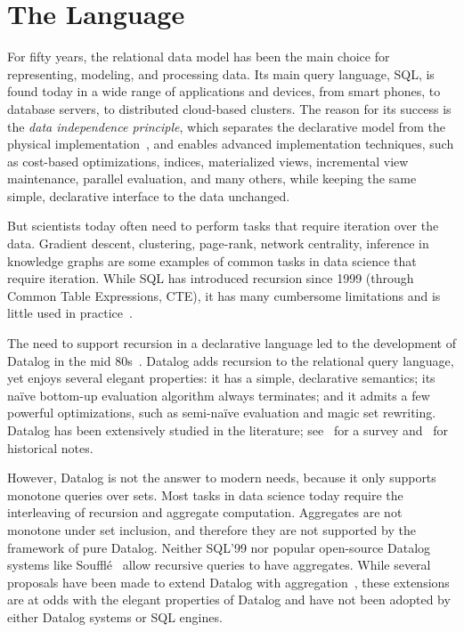 \chapter{The \datalogo Language}
\label{chap:datalogo}

For fifty years, the relational data model has been the main choice for
representing, modeling, and processing data.  Its main query
language, SQL, is found today in a wide range of applications and
devices, from smart phones, to database servers, to distributed
cloud-based clusters.  The reason for its success is the {\em data
  independence principle}, which separates the declarative model from
the physical implementation~\cite{DBLP:journals/cacm/Codd70}, and
enables advanced implementation techniques, such as cost-based
optimizations, indices, materialized views, incremental view
maintenance, parallel evaluation, and many others, while keeping the
same simple, declarative interface to the data unchanged.

But scientists today often need to perform tasks that require
iteration over the data.
Gradient descent, clustering, page-rank, network centrality, inference
in knowledge graphs are some examples of common tasks in data science
that require iteration.  While SQL has introduced recursion since 1999
(through Common Table Expressions, CTE), it has many cumbersome
limitations and is little used in practice~\cite{frankmcsherry-2022}.

The need to support recursion in a declarative language led to the
development of Datalog in the mid 80s~\cite{DBLP:conf/pods/Vianu21}.
Datalog adds recursion to the relational query language, yet enjoys several elegant
properties: it has a simple, declarative semantics; its na\"ive
bottom-up evaluation algorithm always terminates; and it admits a few
powerful optimizations, such as semi-na\"ive evaluation and magic set
rewriting.  Datalog has been extensively studied in the literature;
see~\cite{DBLP:journals/ftdb/GreenHLZ13} for a survey
and~\cite{DBLP:books/mc/18/MaierTKW18,DBLP:conf/pods/Vianu21} for historical notes.

However, Datalog is not the answer to modern needs, because it only
supports monotone queries over sets.  Most tasks in data science today
require the interleaving of recursion and aggregate computation.
Aggregates are not monotone under set inclusion, and therefore they
are not supported by the framework of pure Datalog.  Neither SQL'99
nor popular open-source Datalog systems like
Souffl\'e~\cite{DBLP:conf/cav/JordanSS16} allow recursive queries to
have aggregates.  While several proposals have been made to extend
Datalog with
aggregation~\cite{DBLP:conf/pods/GangulyGZ91,DBLP:conf/pods/RossS92,DBLP:journals/jcss/GangulyGZ95,DBLP:journals/vldb/MazuranSZ13,DBLP:conf/icde/ShkapskyYZ15,DBLP:conf/sigmod/ShkapskyYICCZ16,DBLP:conf/amw/ZanioloYDI16,DBLP:journals/tplp/ZanioloYDSCI17,DBLP:conf/amw/ZanioloYIDSC18,DBLP:journals/tplp/CondieDISYZ18,DBLP:conf/sigmod/0001WMSYDZ19,DBLP:journals/corr/abs-1910-08888,DBLP:journals/corr/abs-1909-08249,DBLP:journals/debu/ZanioloD0LL021},
these extensions are at odds with the elegant properties of Datalog
and have not been adopted by either Datalog systems or SQL engines.

